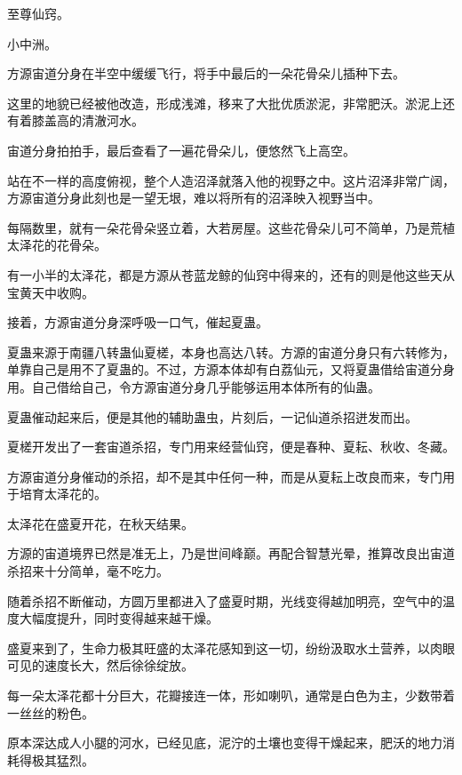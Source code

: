
\begin{this_body}



至尊仙窍。

小中洲。

方源宙道分身在半空中缓缓飞行，将手中最后的一朵花骨朵儿插种下去。

这里的地貌已经被他改造，形成浅滩，移来了大批优质淤泥，非常肥沃。淤泥上还有着膝盖高的清澈河水。

宙道分身拍拍手，最后查看了一遍花骨朵儿，便悠然飞上高空。

站在不一样的高度俯视，整个人造沼泽就落入他的视野之中。这片沼泽非常广阔，方源宙道分身此刻也是一望无垠，难以将所有的沼泽映入视野当中。

每隔数里，就有一朵花骨朵竖立着，大若房屋。这些花骨朵儿可不简单，乃是荒植太泽花的花骨朵。

有一小半的太泽花，都是方源从苍蓝龙鲸的仙窍中得来的，还有的则是他这些天从宝黄天中收购。

接着，方源宙道分身深呼吸一口气，催起夏蛊。

夏蛊来源于南疆八转蛊仙夏槎，本身也高达八转。方源的宙道分身只有六转修为，单靠自己是用不了夏蛊的。不过，方源本体却有白荔仙元，又将夏蛊借给宙道分身用。自己借给自己，令方源宙道分身几乎能够运用本体所有的仙蛊。

夏蛊催动起来后，便是其他的辅助蛊虫，片刻后，一记仙道杀招迸发而出。

夏槎开发出了一套宙道杀招，专门用来经营仙窍，便是春种、夏耘、秋收、冬藏。

方源宙道分身催动的杀招，却不是其中任何一种，而是从夏耘上改良而来，专门用于培育太泽花的。

太泽花在盛夏开花，在秋天结果。

方源的宙道境界已然是准无上，乃是世间峰巅。再配合智慧光晕，推算改良出宙道杀招来十分简单，毫不吃力。

随着杀招不断催动，方圆万里都进入了盛夏时期，光线变得越加明亮，空气中的温度大幅度提升，同时变得越来越干燥。

盛夏来到了，生命力极其旺盛的太泽花感知到这一切，纷纷汲取水土营养，以肉眼可见的速度长大，然后徐徐绽放。

每一朵太泽花都十分巨大，花瓣接连一体，形如喇叭，通常是白色为主，少数带着一丝丝的粉色。

原本深达成人小腿的河水，已经见底，泥泞的土壤也变得干燥起来，肥沃的地力消耗得极其猛烈。


\end{this_body}
